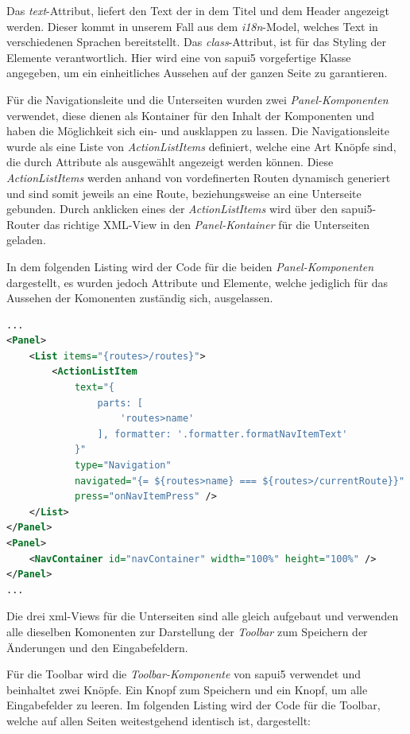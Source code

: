 Das \textit{text}-Attribut, liefert den Text der in dem Titel und dem Header angezeigt werden.
Dieser kommt in unserem Fall aus dem \textit{i18n}-Model, welches Text in verschiedenen Sprachen bereitstellt.
Das \textit{class}-Attribut, ist für das Styling der Elemente verantwortlich. 
Hier wird eine von \gls{sapui5} vorgefertige Klasse angegeben, um ein einheitliches Aussehen auf der ganzen Seite zu garantieren.

Für die Navigationsleite und die Unterseiten wurden zwei \textit{Panel-Komponenten} verwendet, diese dienen als Kontainer für den Inhalt der Komponenten und haben die Möglichkeit sich ein- und ausklappen zu lassen.
Die Navigationsleite wurde als eine Liste von \textit{ActionListItems} definiert, welche eine Art Knöpfe sind, die durch Attribute als ausgewählt angezeigt werden können.
Diese \textit{ActionListItems} werden anhand von vordefinerten Routen dynamisch generiert und sind somit jeweils an eine Route, beziehungsweise an eine Unterseite gebunden.
Durch anklicken eines der \textit{ActionListItems} wird über den \gls{sapui5}-Router das richtige XML-View in den \textit{Panel-Kontainer} für die Unterseiten geladen.

In dem folgenden Listing wird der Code für die beiden \textit{Panel-Komponenten} dargestellt, es wurden jedoch Attribute und Elemente, welche jediglich für das Aussehen der Komonenten zuständig sich, ausgelassen. 

\begin{lstlisting}[caption={Navigationsleisten- und Unterseiten-Kontainer des Admin-UIs}, language={XML}]
...
<Panel>
    <List items="{routes>/routes}">
        <ActionListItem
            text="{
                parts: [
                    'routes>name'
                ], formatter: '.formatter.formatNavItemText'
            }"
            type="Navigation"
            navigated="{= ${routes>name} === ${routes>/currentRoute}}"
            press="onNavItemPress" />
    </List>
</Panel>
<Panel>
    <NavContainer id="navContainer" width="100%" height="100%" />
</Panel>
...
\end{lstlisting}

Die drei \gls{xml}-Views für die Unterseiten sind alle gleich aufgebaut und verwenden alle dieselben Komonenten zur Darstellung der \textit{Toolbar} zum Speichern der Änderungen und den Eingabefeldern.

Für die Toolbar wird die \textit{Toolbar-Komponente} von \gls{sapui5} verwendet und beinhaltet zwei Knöpfe.
Ein Knopf zum Speichern und ein Knopf, um alle Eingabefelder zu leeren. 
Im folgenden Listing wird der Code für die Toolbar, welche auf allen Seiten weitestgehend identisch ist, dargestellt:

